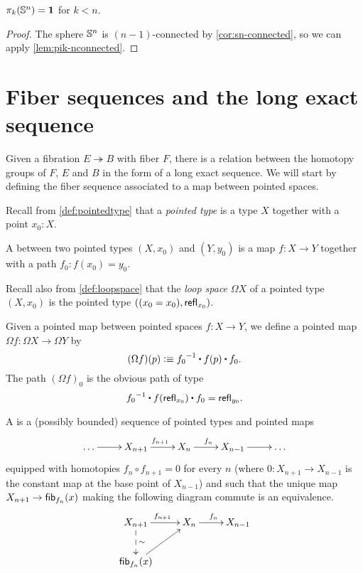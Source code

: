 \begin{cor}
  $\pi_k(\mathbb{S} ^n) = \mathbf{1}$ for $k < n$.
\end{cor}
\begin{proof}
  The sphere $\mathbb{S}^n$ is $(n-1)$-connected by \autoref{cor:sn-connected}, so
  we can apply \autoref{lem:pik-nconnected}.
\end{proof}

\section{Fiber sequences and the long exact sequence}
\label{sec:long-exact-sequence-homotopy-groups}

Given a fibration $E \twoheadrightarrow B$ with fiber $F$, there is a relation
between the homotopy groups of $F$, $E$ and $B$ in the form of a long exact
sequence. We will start by defining the fiber sequence associated to a map
between pointed spaces.

Recall from \autoref{def:pointedtype} that a \emph{pointed type} is a type $X$ together with a point $x_0:X$.

\begin{defn}\label{def:pointedmap}
  A 
  between two pointed types $(X,x_0)$ and $(Y,y_0)$ is a
  map $f:X\to Y$ together with a path $f_0:f(x_0)=y_0$.
\end{defn}

Recall also from \autoref{def:loopspace} that the \emph{loop space} $\Omega X$ of a pointed type $(X,x_0)$ is the pointed type $((x_0=x_0), \mathsf{refl}_{x_0})$.

\begin{defn}
  Given a pointed map between pointed spaces $f:X \to Y$, we define a pointed
  map $\Omega f:\Omega X
  \to \Omega Y$ by
  \[(\Omega f)(p) \defeq \rev{f_0}\ct\ap{f}{p}\ct f_0.\]
  The path $(\Omega f)_0$ is the obvious path of type
  \[\rev{f_0}\ct\ap{f}{\refl{x_0}}\ct f_0=\refl{y_0}.\]
\end{defn}

\begin{defn}
  A 
  is a (possibly bounded) sequence of pointed types
  and pointed maps
  \[\xymatrix{\dots \ar[r] & X_{n+1} \ar^{f_{n+1}}[r] & X_n \ar^{f_n}[r] & X_{n-1} \ar[r] &
    \dots}\]
  equipped with homotopies $f_n\circ f_{n+1}=0$ for every $n$ (where
  $0:X_{n+1}\to X_{n-1}$ is the constant map at the base point of $X_{n-1}$) and
  such that the unique map $X_{n+1}\to{\mathsf{fib}}_{f_n}(x)$ making the following diagram
  commute is an equivalence.
  \[\xymatrix{X_{n+1} \ar@{-->}^\sim[d] \ar^{f_{n+1}}[r] & X_n \ar^{f_n}[r] & X_{n-1} \\
    \hfib{f_n}{x} \ar[ur] & &}\]
\end{defn}

